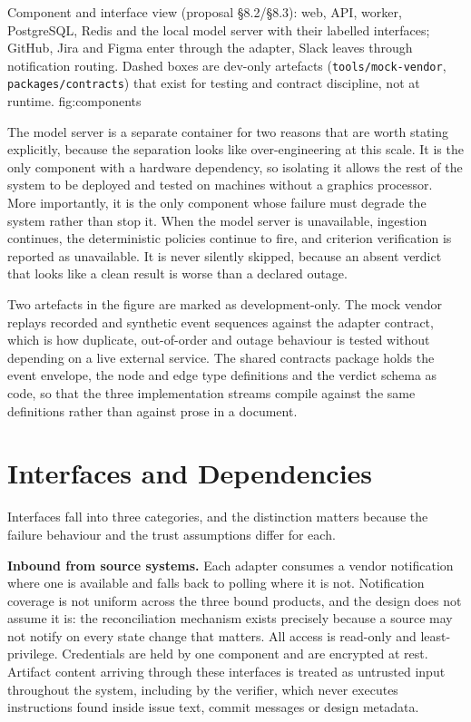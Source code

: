 \lsfigure{}
  {Component and interface view (proposal §8.2/§8.3): web, API,
           worker, PostgreSQL, Redis and the local model server with their
           labelled interfaces; GitHub, Jira and Figma enter through the
           adapter, Slack leaves through notification routing. Dashed boxes
           are dev-only artefacts (\texttt{tools/mock-vendor},
           \texttt{packages/contracts}) that exist for testing and contract
           discipline, not at runtime.}
  {fig:components}

The model server is a separate container for two reasons that are worth stating
explicitly, because the separation looks like over-engineering at this scale. It
is the only component with a hardware dependency, so isolating it allows the
rest of the system to be deployed and tested on machines without a graphics
processor. More importantly, it is the only component whose failure must degrade
the system rather than stop it. When the model server is unavailable, ingestion
continues, the deterministic policies continue to fire, and criterion
verification is reported as unavailable. It is never silently skipped, because
an absent verdict that looks like a clean result is worse than a declared
outage.

Two artefacts in the figure are marked as development-only. The mock vendor
replays recorded and synthetic event sequences against the adapter contract,
which is how duplicate, out-of-order and outage behaviour is tested without
depending on a live external service. The shared contracts package holds the
event envelope, the node and edge type definitions and the verdict schema as
code, so that the three implementation streams compile against the same
definitions rather than against prose in a document.

\section{Interfaces and Dependencies}

Interfaces fall into three categories, and the distinction matters because the
failure behaviour and the trust assumptions differ for each.

\textbf{Inbound from source systems.} Each adapter consumes a vendor
notification where one is available and falls back to polling where it is not.
Notification coverage is not uniform across the three bound products, and the
design does not assume it is: the reconciliation mechanism exists precisely
because a source may not notify on every state change that matters. All access
is read-only and least-privilege. Credentials are held by one component and are
encrypted at rest. Artifact content arriving through these interfaces is treated
as untrusted input throughout the system, including by the verifier, which never
executes instructions found inside issue text, commit messages or design
metadata.

